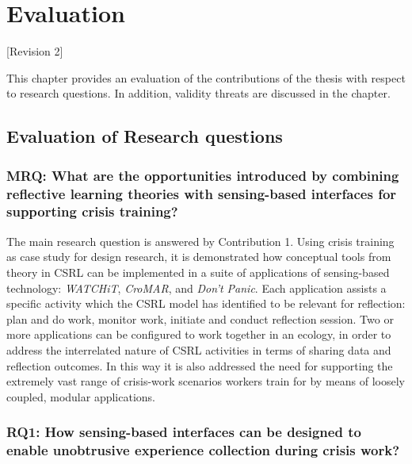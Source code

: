 \chapter{Evaluation}\label{evaluation}

{[}Revision 2{]}

This chapter provides an evaluation of the contributions of the thesis
with respect to research questions. In addition, validity threats are
discussed in the chapter.

\section{Evaluation of Research
questions}\label{evaluation-of-research-questions}

\subsection{MRQ: What are the opportunities introduced by combining
reflective learning theories with sensing-based interfaces for
supporting crisis
training?}\label{mrq-what-are-the-opportunities-introduced-by-combining-reflective-learning-theories-with-sensing-based-interfaces-for-supporting-crisis-training}

The main research question is answered by Contribution 1. Using crisis
training as case study for design research, it is demonstrated how
conceptual tools from theory in CSRL can be implemented in a suite of
applications of sensing-based technology: \emph{WATCHiT}, \emph{CroMAR},
and \emph{Don't Panic}. Each application assists a specific activity
which the CSRL model has identified to be relevant for reflection: plan
and do work, monitor work, initiate and conduct reflection session. Two
or more applications can be configured to work together in an ecology,
in order to address the interrelated nature of CSRL activities in terms
of sharing data and reflection outcomes. In this way it is also
addressed the need for supporting the extremely vast range of
crisis-work scenarios workers train for by means of loosely coupled,
modular applications.

\subsection{RQ1: How sensing-based interfaces can be designed to enable
unobtrusive experience collection during crisis
work?}\label{rq1-how-sensing-based-interfaces-can-be-designed-to-enable-unobtrusive-experience-collection-during-crisis-work}

